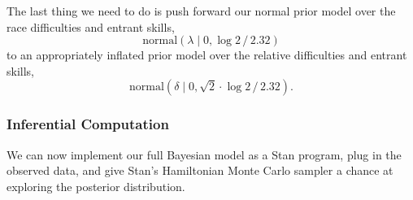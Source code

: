 \documentclass[
  letterpaper,
  DIV=11,
  numbers=noendperiod]{scrartcl}
\newenvironment{Shaded}{\begin{snugshade}}{\end{snugshade}}
\newcommand{\FunctionTok}[1]{\textcolor[rgb]{0.28,0.35,0.67}{#1}}
\newcommand{\NormalTok}[1]{\textcolor[rgb]{0.00,0.23,0.31}{#1}}
\newcommand{\OtherTok}[1]{\textcolor[rgb]{0.00,0.23,0.31}{#1}}
\newcommand{\SpecialCharTok}[1]{\textcolor[rgb]{0.37,0.37,0.37}{#1}}
\begin{document}
\begin{Shaded}
\end{Shaded}

The last thing we need to do is push forward our normal prior model over
the race difficulties and entrant skills, \[
\text{normal}( \lambda \mid 0, \log 2 \, / \, 2.32)
\] to an appropriately inflated prior model over the relative
difficulties and entrant skills, \[
\text{normal}( \delta \mid 0, \sqrt{2} \cdot \log 2 \, / \, 2.32).
\]

\subsubsection{Inferential Computation}\label{inferential-computation}

We can now implement our full Bayesian model as a Stan program, plug in
the observed data, and give Stan's Hamiltonian Monte Carlo sampler a
chance at exploring the posterior distribution.
\end{document}
